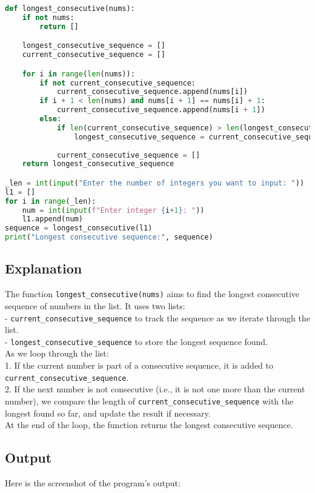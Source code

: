 \documentclass{article}
\begin{document}
\begin{lstlisting}[language=Python]
def longest_consecutive(nums):
    if not nums:
        return []

    longest_consecutive_sequence = []
    current_consecutive_sequence = []

    for i in range(len(nums)):
        if not current_consecutive_sequence:
            current_consecutive_sequence.append(nums[i])
        if i + 1 < len(nums) and nums[i + 1] == nums[i] + 1:
            current_consecutive_sequence.append(nums[i + 1])
        else:
            if len(current_consecutive_sequence) > len(longest_consecutive_sequence):
                longest_consecutive_sequence = current_consecutive_sequence
                
            current_consecutive_sequence = []
    return longest_consecutive_sequence

_len = int(input("Enter the number of integers you want to input: "))
l1 = []
for i in range(_len):
    num = int(input(f"Enter integer {i+1}: "))
    l1.append(num)
sequence = longest_consecutive(l1)
print("Longest consecutive sequence:", sequence)
\end{lstlisting}

\subsection{Explanation}
The function \texttt{longest\_consecutive(nums)} aims to find the longest consecutive sequence of numbers in the list. It uses two lists:\\
- \texttt{current\_consecutive\_sequence} to track the sequence as we iterate through the list.\\
- \texttt{longest\_consecutive\_sequence} to store the longest sequence found.\\
As we loop through the list:\\
1. If the current number is part of a consecutive sequence, it is added to \texttt{current\_consecutive\_sequence}.\\
2. If the next number is not consecutive (i.e., it is not one more than the current number), we compare the length of \texttt{current\_consecutive\_sequence} with the longest found so far, and update the result if necessary.\\
At the end of the loop, the function returns the longest consecutive sequence.

\subsection{Output}
Here is the screenshot of the program's output:
\end{document}
